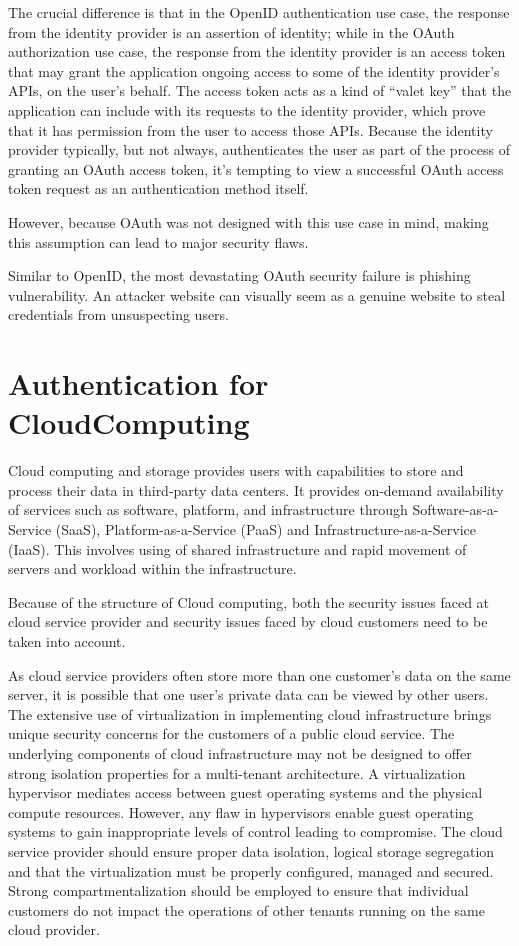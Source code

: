 \begin{multicols}{2}
The crucial difference is that in the OpenID authentication use case, the response from the identity provider is an assertion of identity; while in the OAuth authorization use case, the response from the identity provider is an access token that may grant the application ongoing access to some of the identity provider's APIs, on the user's behalf. The access token acts as a kind of ``valet key'' that the application can include with its requests to the identity provider, which prove that it has permission from the user to access those APIs. Because the identity provider typically, but not always, authenticates the user as part of the process of granting an OAuth access token, it's tempting to view a successful OAuth access token request as an authentication method itself.

However, because OAuth was not designed with this use case in mind, making this assumption can lead to major security flaws.

Similar to OpenID, the most devastating OAuth security failure is phishing vulnerability. An attacker website can visually seem as a genuine website to steal credentials from unsuspecting users.\\[-21pt]

\section{Authentication for Cloud\hfill\break Computing}

\vskip -3pt

Cloud computing and storage provides users with capabilities to store and process their data in third-party data centers. It provides on-demand availability of services such as software, platform, and infrastructure through Software-as-a-Service (SaaS), Platform-as-a-Service (PaaS) and Infrastructure-as-a-Service (IaaS). This involves using of shared infrastructure and rapid movement of servers and workload within the infrastructure. 

Because of the structure of Cloud computing, both the security issues faced at cloud service provider and security issues faced by cloud customers need to be taken into account.

As cloud service providers often store more than one customer's data on the same server, it is possible that one user's private data can be viewed by other users. The extensive use of virtualization in implementing cloud infrastructure brings unique security concerns for the customers of a public cloud service. The underlying components of cloud infrastructure may not be designed to offer strong isolation properties for a multi-tenant architecture. A virtualization hypervisor mediates access between guest operating systems and the physical compute resources. However, any flaw in hypervisors enable guest operating systems to gain inappropriate levels of control leading to compromise. The cloud service provider should ensure proper data isolation, logical storage segregation and that the virtualization must be properly configured, managed and secured. Strong compartmentalization should be employed to ensure that individual customers do not impact the operations of other tenants running on the same cloud provider.


\end{multicols}
